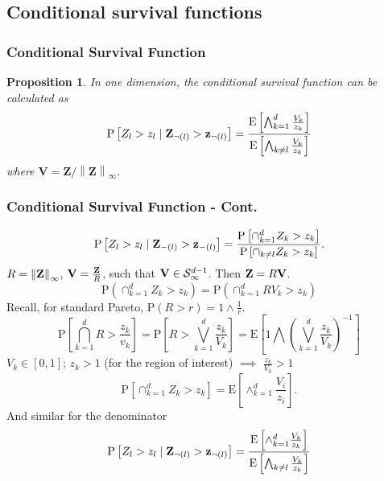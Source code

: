 \documentclass[aspectratio=169]{beamer}
\newcommand{\norm}[1]{\left\lVert #1 \right\rVert}
\newcommand{\pnorm}[2]{\norm{#1}_{#2}}
\newtheorem{prop}{Proposition}
\begin{document}
\subsection{Conditional survival functions}

\begin{frame}
  \frametitle{Conditional Survival Function}
  \begin{prop}
      In one dimension, the conditional survival function can be calculated as
   \begin{equation*}
      \label{eqn:condsurv1df}
      \text{P}\left[Z_l > z_l\mid {\bf Z}_{\neg(l)} > {\bf z}_{\neg(l)}\right] =
        \frac{\text{E}\left[\bigwedge_{k = 1}^d \frac{V_k}{z_k}\right]}{
                      \text{E}\left[\bigwedge_{k \neq l}\frac{V_k}{z_k}\right]}
    \end{equation*}
      where $\bm{V} = \bm{Z} / \pnorm{\bm{Z}}{\infty}$.
  \end{prop}
\end{frame}

\begin{frame}
  \frametitle{Conditional Survival Function - Cont.}
  \begin{footnotesize}
  \begin{equation*}
    \label{eqn:condsurv1d}
    \text{P}\left[Z_l > z_l\mid {\bf Z}_{-(l)} > {\bf z}_{-(l)}\right] =
      \frac{\text{P}\left[\cap_{k = 1}^d Z_k > z_k\right]}{\text{P}\left[\cap_{k \neq l} Z_k > z_k\right]}.
  \end{equation*}
  \pause
  $R = \pnorm{{\bf Z}}{\infty}$, ${\bf V} = \frac{{\bf Z}}{R}$, such that
    ${\bf V}\in \mathcal{S}_{\infty}^{d-1}$.  Then ${\bf Z} = R{\bf V}$.
  \begin{equation*}
    \text{P}\left(\cap_{k = 1}^d Z_k > z_k\right) = \text{P}\left(\cap_{k = 1}^d RV_k > z_k\right)
  \end{equation*}
  \pause
  Recall, for standard Pareto, $\text{P}(R > r) = 1\wedge\frac{1}{r}$.
  \begin{equation*}
    \text{P}\left[\bigcap_{k = 1}^d R > \frac{z_k}{v_k}\right] =
      \text{P}\left[R  > \bigvee_{k=1}^d\frac{z_k}{V_k}\right] =
      \text{E}\left[1 \bigwedge \left(\bigvee_{k = 1}^d\frac{z_k}{V_k}\right)^{-1}\right]
  \end{equation*}
  $V_k \in [0,1]$; $z_k > 1$ (for the region of interest) $\implies$ $\frac{z_k}{V_k} > 1$
  \pause
  \begin{equation*}
    \text{P}\left[\cap_{k = 1}^d Z_k > z_k\right] = \text{E}\left[\wedge_{k = 1}^d\frac{V_i}{z_i}\right].
  \end{equation*}
  \pause
  And similar for the denominator
  \begin{equation*}
    \text{P}\left[Z_l > z_l\mid {\bf Z}_{\neg(l)} > {\bf z}_{\neg(l)}\right] =
      \frac{\text{E}\left[\wedge_{k = 1}^d \frac{V_k}{z_k}\right]}{\text{E}\left[
                \bigwedge_{k \neq l}\frac{V_k}{z_k}\right]}
  \end{equation*}
  \end{footnotesize}
\end{frame}
\end{document}
